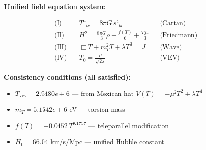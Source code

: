 
\textbf{Unified field equation system:}

\begin{align}
  \text{(I)} \quad & T^a{}_{bc} = 8\pi G \, s^a{}_{bc} && \text{(Cartan)} \\
  \text{(II)} \quad & H^2 = \frac{8\pi G}{3}\rho - \frac{f(T)}{6} + \frac{Tf_T}{3} && \text{(Friedmann)} \\
  \text{(III)} \quad & \Box T + m_T^2 T + \lambda T^3 = J && \text{(Wave)} \\
  \text{(IV)} \quad & T_0 = \frac{\mu}{\sqrt{2\lambda}} && \text{(VEV)}
\end{align}

\textbf{Consistency conditions (all satisfied):}
\begin{itemize}
  \item $T_{\text{vev}} = 2.9480e+6$ — from Mexican hat $V(T) = -\mu^2 T^2 + \lambda T^4$
  \item $m_T = 5.1542e+6$ eV — torsion mass
  \item $f(T) = -0.0452 \, T^{0.1737}$ — teleparallel modification
  \item $H_0 = 66.04$ km/s/Mpc — unified Hubble constant
\end{itemize}
